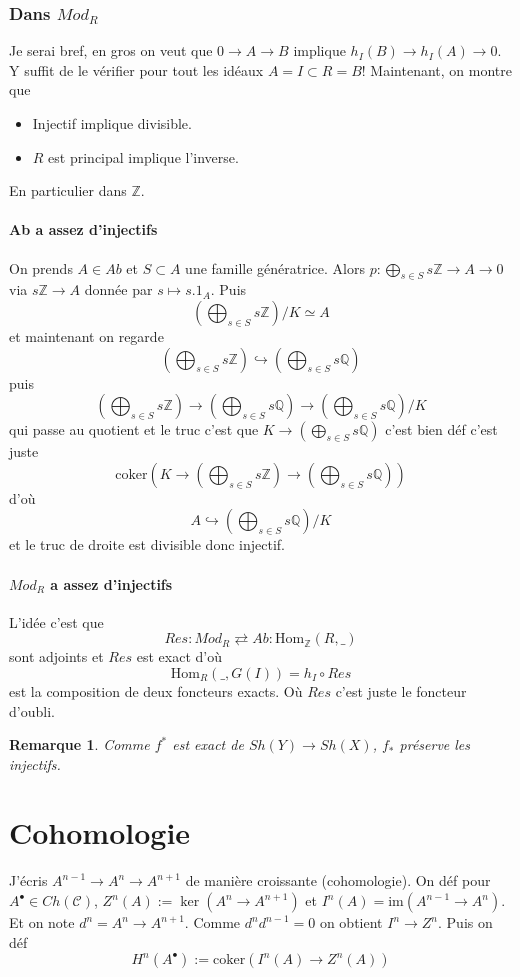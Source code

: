 \documentclass[a4paper,12pt]{book}
\newcommand{\Z}{\mathbb{Z}}
\newcommand{\Q}{\mathbb{Q}}
\newcommand{\Cat}{\mathcal{C}}
\newcommand{\Hom}{\textrm{Hom}}
\newcommand{\im}{\textrm{im}}
\newcommand{\coker}{\textrm{coker}}
\theoremstyle{plain}
\newtheorem{rem}{Remarque}
\theoremstyle{definition}
\theoremstyle{remark}
\begin{document}
\subsection{Dans $Mod_R$}
Je serai bref, en gros on veut que $0\to A\to B$ implique
$h_I(B)\to h_I(A)\to 0$. Y suffit de le vérifier pour tout 
les idéaux $A=I\subset R=B$! Maintenant, on montre que
\begin{itemize}
  \item Injectif implique divisible.
  \item $R$ est principal implique l'inverse.
\end{itemize}
En particulier dans $\Z$.
\subsubsection{Ab a assez d'injectifs}
On prends $A\in Ab$ et $S\subset A$ une famille génératrice.
Alors $p\colon \bigoplus_{s\in S}s\Z\to A\to 0$ via $s\Z\to A$
donnée par $s\mapsto s.1_A$. Puis 
\[(\bigoplus_{s\in S}s\Z)/K\simeq A\]
et maintenant on regarde
\[(\bigoplus_{s\in S}s\Z)\hookrightarrow (\bigoplus_{s\in S}s\Q)\]
puis
\[(\bigoplus_{s\in S}s\Z)\to (\bigoplus_{s\in S}s\Q)\to (\bigoplus_{s\in S}s\Q)/K\]
qui passe au quotient et le truc c'est que 
$K\to (\bigoplus_{s\in S}s\Q)$ c'est bien déf c'est juste
\[\coker(K\to (\bigoplus_{s\in S}s\Z)\to (\bigoplus_{s\in S}s\Q))\]
d'où \[A\hookrightarrow (\bigoplus_{s\in S}s\Q)/K\]
et le truc de droite est divisible donc injectif.

\subsubsection{$Mod_R$ a assez d'injectifs}
L'idée c'est que 
\[Res\colon Mod_R\rightleftarrows Ab\colon \Hom_{\Z}(R,\_)\]
sont adjoints et $Res$ est exact d'où 
\[\Hom_R(\_,G(I))=h_I\circ Res\] est la
composition de deux foncteurs exacts. Où $Res$ c'est juste le
foncteur d'oubli.

\begin{rem}
  Comme $f^*$ est exact de $Sh(Y)\to Sh(X)$, $f_*$ préserve
  les injectifs.
\end{rem}

\chapter{Cohomologie}
J'écris $A^{n-1}\to A^n\to A^{n+1}$ de manière croissante 
(cohomologie).
On déf pour $A^\bullet\in Ch(\Cat)$, $Z^n(A):=\ker(A^n\to A^{n+1})$
et $I^n(A)=\im(A^{n-1}\to A^n)$. Et on note $d^n=A^n\to A^{n+1}$.
Comme $d^nd^{n-1}=0$ on obtient $I^n\to Z^n$. Puis on déf
\[H^n(A^\bullet):=\coker(I^n(A)\to Z^n(A))\]
\end{document}
